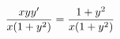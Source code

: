 \documentclass[preview]{standalone}
\begin{document}
\begin{align*}
\special{dvisvgm:raw <g id='unique000'>}\frac{xyy'}{x(1+y^2)}=\frac{1+y^2}{x(1+y^2)}\special{dvisvgm:raw </g>}
\end{align*}
\end{document}
